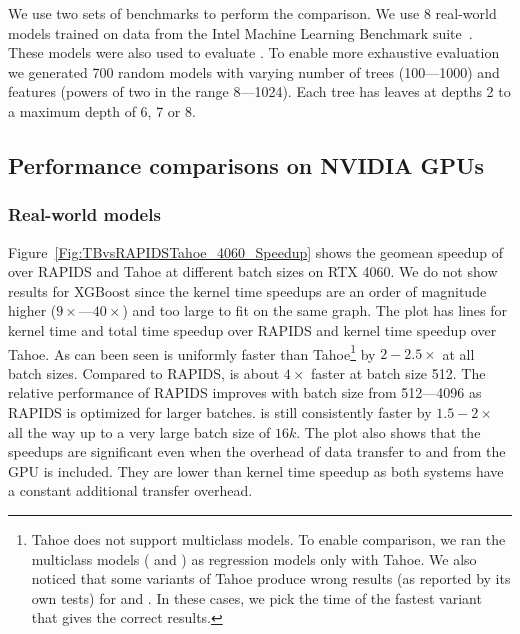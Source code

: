 We use two sets of benchmarks to perform the comparison.
We use 8 real-world models trained on data from the Intel Machine 
Learning Benchmark suite~\cite{MLBenchmarks}. These models were also
used to evaluate \TreebeardOLD{}\cite{Treebeard}.
To enable more exhaustive evaluation we generated 700 random models with
varying number of trees (100---1000) and features (powers of two in the range 8---1024). 
Each tree has leaves at depths 2 to a maximum depth of 6, 7 or 8.

\subsection{Performance comparisons on NVIDIA GPUs}

\subsubsection*{Real-world models}
Figure~\ref{Fig:TBvsRAPIDSTahoe_4060_Speedup} shows the geomean speedup of \Treebeard{} over RAPIDS and Tahoe at different batch sizes on RTX 4060. 
We do not show results for XGBoost since the kernel time speedups are an order of magnitude higher ($9\times$---$40\times$) and too large to fit on the same graph.  
The plot has lines for kernel time and total time speedup over RAPIDS and kernel time speedup over Tahoe. As can been seen 
\Treebeard{} is uniformly faster than Tahoe{\footnote{Tahoe does not support multiclass models. To enable comparison, we ran 
the multiclass models ( and ) as regression models only with Tahoe. We also noticed that some variants
of Tahoe produce wrong results (as reported by its own tests) for  and . In these cases, we pick the 
time of the fastest variant that gives the correct results.}} by $2-2.5\times$ at all batch sizes. 
Compared to RAPIDS, \Treebeard{} is about $4\times$ faster at batch size 512. The relative performance of RAPIDS improves 
with batch size from 512---4096 as RAPIDS is optimized for larger batches. \Treebeard{} is still consistently faster by $1.5-2\times$ all the way up to a very large batch size of $16k$. 
The plot also shows that the speedups are significant even when the overhead of data transfer to and from the GPU
is included. They are lower than kernel time speedup as both systems have a constant additional transfer overhead.


